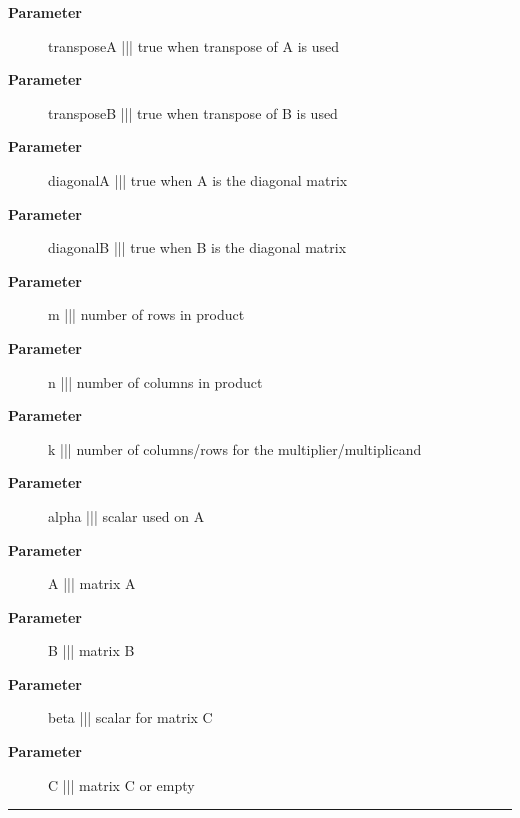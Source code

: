 \par
\begin{description}
\item [\textbf{Parameter}] transposeA ||| true when transpose of A is used
\item [\textbf{Parameter}] transposeB ||| true when transpose of B is used
\item [\textbf{Parameter}] diagonalA ||| true when A is the diagonal matrix
\item [\textbf{Parameter}] diagonalB ||| true when B is the diagonal matrix
\item [\textbf{Parameter}] m ||| number of rows in product
\item [\textbf{Parameter}] n ||| number of columns in product
\item [\textbf{Parameter}] k ||| number of columns/rows for the multiplier/multiplicand
\item [\textbf{Parameter}] alpha ||| scalar used on A
\item [\textbf{Parameter}] A ||| matrix A
\item [\textbf{Parameter}] B ||| matrix B
\item [\textbf{Parameter}] beta ||| scalar for matrix C
\item [\textbf{Parameter}] C ||| matrix C or empty
\end{description}

\rule{\linewidth}{0.5pt}
